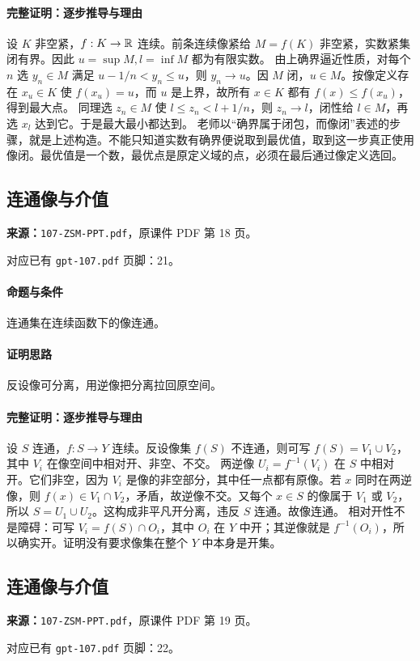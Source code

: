 \paragraph{完整证明：逐步推导与理由}

设 $K$ 非空紧，$f:K\to\mathbb{R}$ 连续。前条连续像紧给 $M=f(K)$ 非空紧，实数紧集闭有界。因此 $u=\sup M,l=\inf M$ 都为有限实数。
由上确界逼近性质，对每个 $n$ 选 $y_n\in M$ 满足 $u-1/n<y_n\le u$，则 $y_n\to u$。因 $M$ 闭，$u\in M$。按像定义存在 $x_u\in K$ 使 $f(x_u)=u$，而 $u$ 是上界，故所有 $x\in K$ 都有 $f(x)\le f(x_u)$，得到最大点。
同理选 $z_n\in M$ 使 $l\le z_n<l+1/n$，则 $z_n\to l$，闭性给 $l\in M$，再选 $x_l$ 达到它。于是最大最小都达到。
老师以“确界属于闭包，而像闭”表述的步骤，就是上述构造。不能只知道实数有确界便说取到最优值，取到这一步真正使用像闭。最优值是一个数，最优点是原定义域的点，必须在最后通过像定义选回。

\clearpage\subsection{连通像与介值}
\textbf{来源：}\texttt{107-ZSM-PPT.pdf}，原课件 PDF 第 18 页。\par
对应已有 \texttt{gpt-107.pdf} 页脚：21。\par
\paragraph{命题与条件}连通集在连续函数下的像连通。
\paragraph{证明思路}反设像可分离，用逆像把分离拉回原空间。
\paragraph{完整证明：逐步推导与理由}

设 $S$ 连通，$f:S\to Y$ 连续。反设像集 $f(S)$ 不连通，则可写 $f(S)=V_1\cup V_2$，其中 $V_i$ 在像空间中相对开、非空、不交。
两逆像 $U_i=f^{-1}(V_i)$ 在 $S$ 中相对开。它们非空，因为 $V_i$ 是像的非空部分，其中任一点都有原像。若 $x$ 同时在两逆像，则 $f(x)\in V_1\cap V_2$，矛盾，故逆像不交。又每个 $x\in S$ 的像属于 $V_1$ 或 $V_2$，所以 $S=U_1\cup U_2$。这构成非平凡开分离，违反 $S$ 连通。故像连通。
相对开性不是障碍：可写 $V_i=f(S)\cap O_i$，其中 $O_i$ 在 $Y$ 中开；其逆像就是 $f^{-1}(O_i)$，所以确实开。证明没有要求像集在整个 $Y$ 中本身是开集。

\clearpage\subsection{连通像与介值}
\textbf{来源：}\texttt{107-ZSM-PPT.pdf}，原课件 PDF 第 19 页。\par
对应已有 \texttt{gpt-107.pdf} 页脚：22。\par
